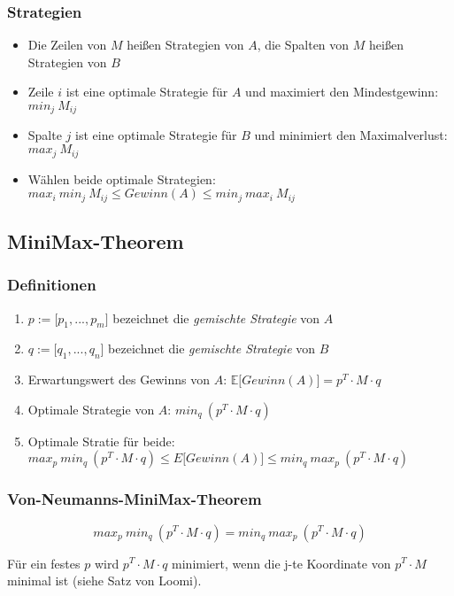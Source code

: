 \subsubsection{Strategien}
\begin{itemize}
	\item Die Zeilen von \(M\) heißen Strategien von \(A\), die Spalten von \(M\) heißen Strategien von \(B\)
	\item Zeile \(i\) ist eine optimale Strategie für \(A\) und maximiert den Mindestgewinn: \(min_j~M_{ij}\)
	\item Spalte \(j\) ist eine optimale Strategie für \(B\) und minimiert den Maximalverlust: \(max_j~M_{ij}\)
	\item Wählen beide optimale Strategien: \(max_i~min_j~M_{ij} \leq Gewinn(A) \leq min_j~max_i~M_{ij}\)
\end{itemize}


\subsection{MiniMax-Theorem}

\subsubsection{Definitionen}
\begin{enumerate}
	\item \(p := \lbrack p_1,...,p_m \rbrack \) bezeichnet die \textit{gemischte Strategie} von \(A\)
	\item \(q := \lbrack q_1,...,q_n \rbrack \) bezeichnet die \textit{gemischte Strategie} von \(B\)
	\item Erwartungswert des Gewinns von \(A\): \(\mathbb{E}\lbrack Gewinn(A) \rbrack = p^T \cdot M \cdot q\)
	\item Optimale Strategie von \(A\): \(min_q~(p^T \cdot M \cdot q)\)
	\item Optimale Stratie für beide: \\ \(max_p~min_q~(p^T \cdot M \cdot q) \leq E \lbrack Gewinn(A) \rbrack \leq min_q~max_p~(p^T \cdot M \cdot q)\)
\end{enumerate}

\subsubsection{Von-Neumanns-MiniMax-Theorem}
\[max_p~min_q~(p^T \cdot M \cdot q) = min_q~max_p~(p^T \cdot M \cdot q)\]

Für ein festes \(p\) wird \(p^T \cdot M \cdot q\) minimiert, wenn die j-te Koordinate von \(p^T \cdot M\) minimal ist (siehe Satz von Loomi).


